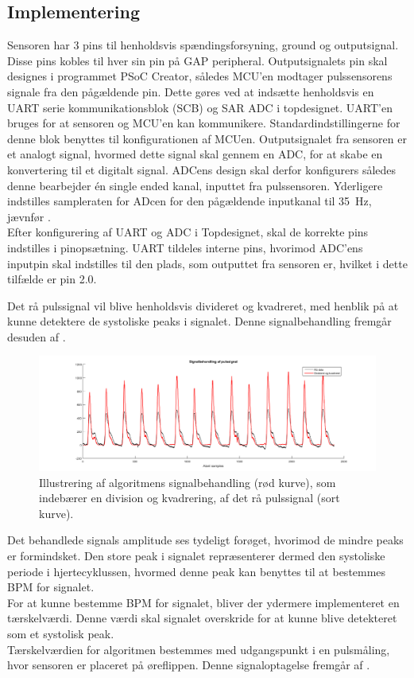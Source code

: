 \subsection{Implementering}
Sensoren har 3 pins til henholdsvis spændingsforsyning, ground og outputsignal. Disse pins kobles til hver sin pin på GAP peripheral. Outputsignalets pin skal designes i programmet PSoC Creator, således MCU'en modtager pulssensorens signale fra den pågældende pin. Dette gøres ved at indsætte henholdsvis en UART serie kommunikationsblok (SCB) og SAR ADC i topdesignet. UART'en bruges for at sensoren og MCU'en kan kommunikere. Standardindstillingerne for denne blok benyttes til konfigurationen af MCUen. \newline
Outputsignalet fra sensoren er et analogt signal, hvormed dette signal skal gennem en ADC, for at skabe en konvertering til et digitalt signal. ADCens design skal derfor konfigurers således denne bearbejder én single ended kanal, inputtet fra pulssensoren. Yderligere indstilles sampleraten for ADcen for den pågældende inputkanal til 35~Hz, jævnfør . \\
Efter konfigurering af UART og ADC i Topdesignet, skal de korrekte pins indstilles i pinopsætning. UART tildeles interne pins, hvorimod ADC'ens inputpin skal indstilles til den plads, som outputtet fra sensoren er, hvilket i dette tilfælde er pin 2.0. 

Det rå pulssignal vil blive henholdsvis divideret og kvadreret, med henblik på at kunne detektere de systoliske peaks i signalet. Denne signalbehandling fremgår desuden af .

\begin{figure}[H]
	\centering
	\includegraphics[scale=0.5]{figures/cDesign/puls_ore_behandlet.png}
	\caption{Illustrering af algoritmens signalbehandling (rød kurve), som indebærer en division og kvadrering, af det rå pulssignal (sort kurve).}
	\label{fig:behandlet_puls}
\end{figure}

Det behandlede signals amplitude ses tydeligt forøget, hvorimod de mindre peaks er formindsket. Den store peak i signalet repræsenterer dermed den systoliske periode i hjertecyklussen, hvormed denne peak kan benyttes til at bestemmes BPM for signalet. \\
For at kunne bestemme BPM for signalet, bliver der ydermere implementeret en tærskelværdi. Denne værdi skal signalet overskride for at kunne blive detekteret som et systolisk peak. \\
Tærskelværdien for algoritmen bestemmes med udgangspunkt i en pulsmåling, hvor sensoren er placeret på øreflippen. Denne signaloptagelse fremgår af .

